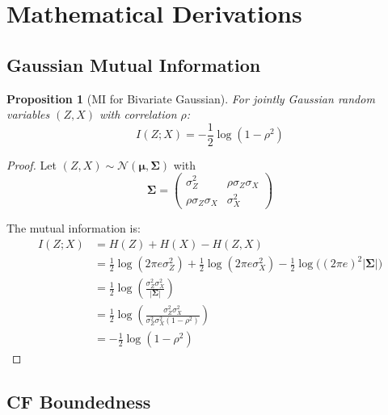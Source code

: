 \documentclass[10pt]{article} %
\theoremstyle{plain}
\newtheorem{proposition}[theorem]{Proposition}
\theoremstyle{definition}
\newcommand{\MI}{I}
\newcommand{\Ent}{H}
\begin{document}

\section{Mathematical Derivations}
\label{app:derivations}

\subsection{Gaussian Mutual Information}

\begin{proposition}[MI for Bivariate Gaussian]
\label{prop:mi-gaussian}
For jointly Gaussian random variables $(Z, X)$ with correlation $\rho$:
\begin{equation}
\MI(Z; X) = -\frac{1}{2}\log(1 - \rho^2)
\end{equation}
\end{proposition}

\begin{proof}
Let $(Z, X) \sim \mathcal{N}(\boldsymbol{\mu}, \boldsymbol{\Sigma})$ with
\[
\boldsymbol{\Sigma} = \begin{pmatrix} \sigma_Z^2 & \rho\sigma_Z\sigma_X \\ \rho\sigma_Z\sigma_X & \sigma_X^2 \end{pmatrix}
\]

The mutual information is:
\begin{align}
\MI(Z; X) &= \Ent(Z) + \Ent(X) - \Ent(Z, X) \\
&= \frac{1}{2}\log(2\pi e \sigma_Z^2) + \frac{1}{2}\log(2\pi e \sigma_X^2) - \frac{1}{2}\log\bigl((2\pi e)^2 |\boldsymbol{\Sigma}|\bigr) \\
&= \frac{1}{2}\log\left(\frac{\sigma_Z^2 \sigma_X^2}{|\boldsymbol{\Sigma}|}\right) \\
&= \frac{1}{2}\log\left(\frac{\sigma_Z^2 \sigma_X^2}{\sigma_Z^2\sigma_X^2(1-\rho^2)}\right) \\
&= -\frac{1}{2}\log(1 - \rho^2)
\end{align}
\end{proof}

\subsection{CF Boundedness}
\end{document}
